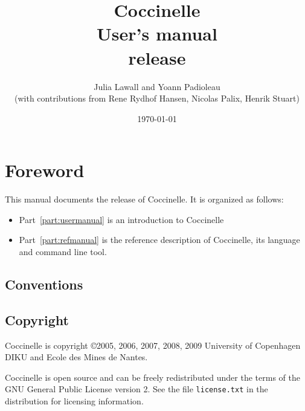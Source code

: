 \documentclass{report}
\begin{document}
\date{}

\title{
{\Huge \bf Coccinelle}\\
{User's manual}\\
{release \cocciversion}\\
}

\author{
Julia Lawall and Yoann Padioleau \\
{(with contributions from 
Rene Rydhof Hansen, 
Nicolas Palix, 
Henrik Stuart)
}
}  

\date{\today}

\maketitle
\tableofcontents


\chapter*{Foreword} 

This manual documents the release \cocciversion of Coccinelle.
It is organized as follows:
\begin{itemize}
  \item Part~\ref{part:usermanual} is an introduction to Coccinelle
  \item Part~\ref{part:refmanual} is the reference description
    of Coccinelle, its language and command line tool.
\end{itemize}

\section*{Conventions}

\section*{Copyright}

Coccinelle is copyright \copyright 2005, 2006, 2007, 2008, 2009 
University of Copenhagen DIKU and Ecole des Mines de Nantes.

Coccinelle is open source and can be freely redistributed under the
terms of the GNU General Public License version 2. See the file
\verb+license.txt+ in the distribution for licensing information.
\end{document}

